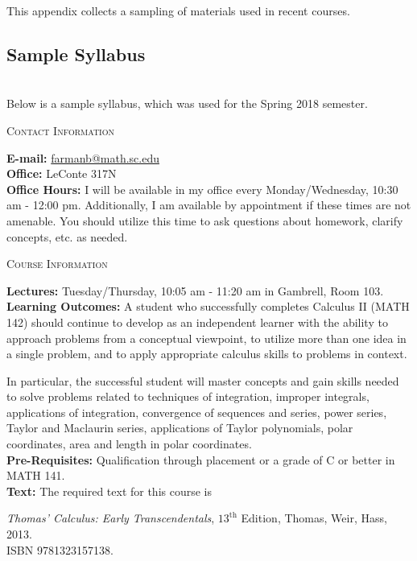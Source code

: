 \documentclass[teaching.portfolio.tex]{subfiles}
\begin{document}
This appendix collects a sampling of materials used in recent courses.

\subsection{Sample Syllabus}\hfill\\
Below is a sample syllabus, which was used for the Spring 2018 semester.
\begin{center}
  \textsc{Contact Information}
\end{center}

\noindent
\textbf{E-mail:} \href{mailto:farmanb@math.sc.edu}{farmanb@math.sc.edu}\\
\noindent\textbf{Office:} LeConte 317N\\
\noindent\textbf{Office Hours:}
I will be available in my office every Monday/Wednesday, 10:30 am - 12:00 pm.
Additionally, I am available by appointment if these times are not amenable.
You should utilize this time to ask questions about homework, clarify concepts, etc. as needed.\\

\begin{center}
  \textsc{Course Information}
\end{center}

\noindent
\textbf{Lectures:}
Tuesday/Thursday,  10:05 am - 11:20 am in Gambrell, Room 103.\\

\noindent\textbf{Learning Outcomes:} A student who successfully completes Calculus II (MATH 142) should continue to develop as an independent learner 
with the ability to approach problems from a conceptual viewpoint, to utilize more than one idea in a single problem, and to apply appropriate 
calculus skills to problems in context.

In particular, the successful student will master concepts and gain skills needed to solve problems related to 
techniques of integration, 
improper integrals, 
applications of integration, 
convergence of sequences and series,
power series,
Taylor and Maclaurin series,
applications of Taylor polynomials,
polar coordinates,
area and length in polar coordinates.\\

\noindent\textbf{Pre-Requisites:} Qualification through placement or a grade of C or better in MATH 141.\\

\noindent\textbf{Text:}
The required text for this course is\\
\begin{center}
  {\it Thomas' Calculus: Early Transcendentals}, $13^{\text{th}}$ Edition, Thomas, Weir, Hass, 2013.  \\ISBN 9781323157138.
\end{center}
\end{document}
